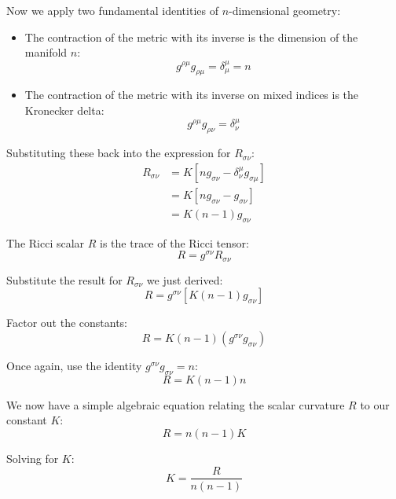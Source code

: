 \documentclass[11pt, a4paper]{report}
\begin{document}
Now we apply two fundamental identities of $n$-dimensional geometry:
\begin{itemize}
    \item The contraction of the metric with its inverse is the dimension of the manifold $n$:
    \begin{equation*}
        g^{\rho\mu} g_{\rho\mu} = \delta^\mu_\mu = n
    \end{equation*}
    \item The contraction of the metric with its inverse on mixed indices is the Kronecker delta:
    \begin{equation*}
        g^{\rho\mu} g_{\rho\nu} = \delta^\mu_\nu
    \end{equation*}
\end{itemize}

Substituting these back into the expression for $R_{\sigma\nu}$:
\begin{align*}
    R_{\sigma\nu} &= K [ n g_{\sigma\nu} - \delta^\mu_\nu g_{\sigma\mu} ] \\
    &= K [ n g_{\sigma\nu} - g_{\sigma\nu} ] \\
    &= K (n - 1) g_{\sigma\nu}
\end{align*}

The Ricci scalar $R$ is the trace of the Ricci tensor:
\begin{equation}
    R = g^{\sigma\nu} R_{\sigma\nu}
\end{equation}

Substitute the result for $R_{\sigma\nu}$ we just derived:
\begin{equation}
    R = g^{\sigma\nu} [ K (n - 1) g_{\sigma\nu} ]
\end{equation}

Factor out the constants:
\begin{equation}
    R = K (n - 1) (g^{\sigma\nu} g_{\sigma\nu})
\end{equation}

Once again, use the identity $g^{\sigma\nu} g_{\sigma\nu} = n$:
\begin{equation}
    R = K (n - 1) n
\end{equation}

We now have a simple algebraic equation relating the scalar curvature $R$ to our constant $K$:
\begin{equation}
    R = n(n-1)K
\end{equation}

Solving for $K$:
\begin{equation}
    K = \frac{R}{n(n-1)}
\end{equation}
\end{document}
